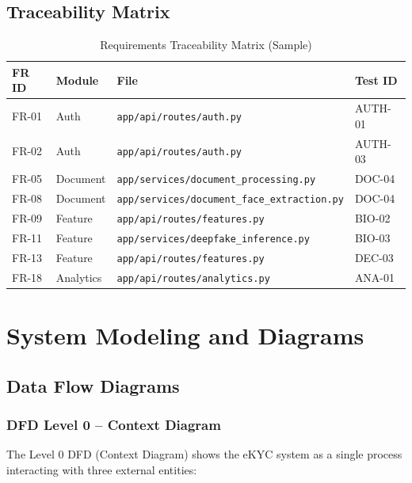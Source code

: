 \documentclass[12pt,a4paper]{report}
\begin{document}
\section{Traceability Matrix}

\begin{table}[H]
\centering
\caption{Requirements Traceability Matrix (Sample)}
\begin{tabular}{@{}llll@{}}
\toprule
\textbf{FR ID} & \textbf{Module} & \textbf{File} & \textbf{Test ID} \\
\midrule
FR-01 & Auth & \texttt{app/api/routes/auth.py} & AUTH-01 \\
FR-02 & Auth & \texttt{app/api/routes/auth.py} & AUTH-03 \\
FR-05 & Document & \texttt{app/services/document\_processing.py} & DOC-04 \\
FR-08 & Document & \texttt{app/services/document\_face\_extraction.py} & DOC-04 \\
FR-09 & Feature & \texttt{app/api/routes/features.py} & BIO-02 \\
FR-11 & Feature & \texttt{app/services/deepfake\_inference.py} & BIO-03 \\
FR-13 & Feature & \texttt{app/api/routes/features.py} & DEC-03 \\
FR-18 & Analytics & \texttt{app/api/routes/analytics.py} & ANA-01 \\
\bottomrule
\end{tabular}
\end{table}

\chapter{System Modeling and Diagrams}

\section{Data Flow Diagrams}

\subsection{DFD Level 0 -- Context Diagram}

The Level 0 DFD (Context Diagram) shows the eKYC system as a single process interacting with three external entities:
\end{document}
